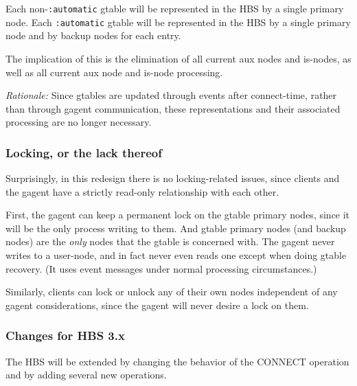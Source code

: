 Each non-{\tt :automatic} gtable will be represented in the HBS by a single
primary node.  Each {\tt :automatic} gtable will be represented in the HBS
by a single primary node and by backup nodes for each entry. 

The implication of this is the elimination of all current aux nodes and
is-nodes, as well as all current aux node and is-node processing.

{\em Rationale: } Since gtables are updated through events after
connect-time, rather than through gagent communication, these
representations and their associated processing are no longer necessary.

\subsubsection*{Locking, or the lack thereof}

Surprisingly, in this redesign there is no locking-related issues, since
clients and the gagent have a strictly read-only relationship with each other.

First, the gagent can keep a permanent lock on the gtable primary nodes,
since it will be the only process writing to them.  And gtable primary
nodes (and backup nodes) are the {\em only} nodes that the gtable is
concerned with.  The gagent never writes to a user-node, and in fact never
even reads one except when doing gtable recovery.  (It uses event messages
under normal processing circumstances.)

Similarly, clients can lock or unlock any of their own nodes independent of
any gagent considerations, since the gagent will never desire a lock on
them.
 
\subsubsection*{Changes for HBS 3.x}

The HBS will be extended by changing the behavior of the CONNECT 
operation and by adding several new operations.

